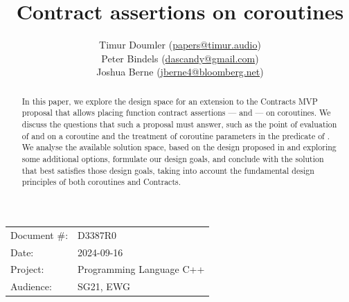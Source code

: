 

 \usepackage[bottom]{footmisc} 

 \usepackage{longtable}


\usepackage{tikz,lipsum,lmodern}
\usepackage[most]{tcolorbox}



\usepackage{titlesec}
\usepackage{tocloft}


\newcommand{\changelocaltocdepth}[1]{%
  \addtocontents{toc}{\protect\setcounter{tocdepth}{#1}}%
  \setcounter{tocdepth}{#1}%
}

\setcounter{tocdepth}{3}



\title{Contract assertions on coroutines}
\author{
Timur Doumler \small(\href{mailto:papers@timur.audio}{papers@timur.audio}) \\
Peter Bindels \small(\href{mailto:dascandy@gmail.com}{dascandy@gmail.com}) \\
Joshua Berne \small(\href{mailto:jberne4@bloomberg.net}{jberne4@bloomberg.net}) 
}
\date{}
\maketitle

\begin{tabular}{ll}
Document \#: & D3387R0 \\
Date: &2024-09-16 \\
Project: & Programming Language C++ \\
Audience: & SG21, EWG
\end{tabular}

\begin{abstract}
In this paper, we explore the design space for an extension to the Contracts MVP proposal \cite{P2900R8} that allows placing function contract assertions ---  and 
 --- on coroutines. We discuss the questions that such a proposal must answer, such as the point of evaluation of  and  on a coroutine and the treatment of coroutine parameters in the predicate of . We analyse the available solution space, based on the design proposed in \cite{P2957R1} and exploring some additional options, formulate our design goals, and conclude with the solution that best satisfies those design goals, taking into account the fundamental design principles of both coroutines and Contracts.
\end{abstract}

